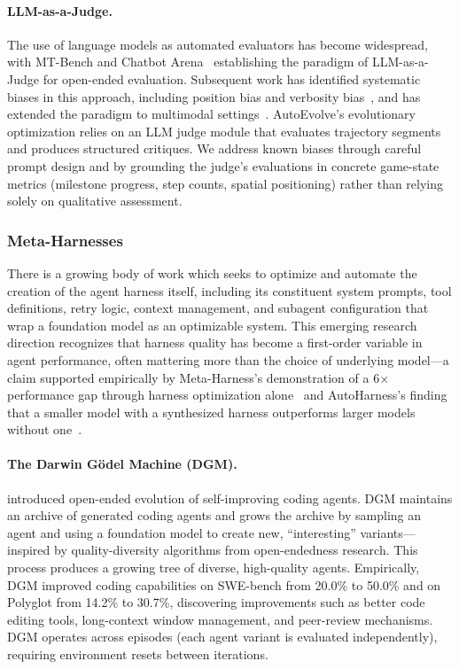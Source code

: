 \paragraph{LLM-as-a-Judge.} The use of language models as automated evaluators has become widespread, with MT-Bench and Chatbot Arena~\citep{zheng2023mtbench} establishing the paradigm of LLM-as-a-Judge for open-ended evaluation. Subsequent work has identified systematic biases in this approach, including position bias and verbosity bias~\citep{zhao2024llmjudgefailures}, and has extended the paradigm to multimodal settings~\citep{chen2024mllmjudge}. AutoEvolve's evolutionary optimization relies on an LLM judge module that evaluates trajectory segments and produces structured critiques. We address known biases through careful prompt design and by grounding the judge's evaluations in concrete game-state metrics (milestone progress, step counts, spatial positioning) rather than relying solely on qualitative assessment.

\subsubsection{Meta-Harnesses}\label{sec:meta_harnesses}

There is a growing body of work which seeks to optimize and automate the creation of the agent harness itself, including its constituent system prompts, tool definitions, retry logic, context management, and subagent configuration that wrap a foundation model as an optimizable system. This emerging research direction recognizes that harness quality has become a first-order variable in agent performance, often mattering more than the choice of underlying model---a claim supported empirically by Meta-Harness's demonstration of a 6$\times$ performance gap through harness optimization alone~\citep{lee2026metaharness} and AutoHarness's finding that a smaller model with a synthesized harness outperforms larger models without one~\citep{lou2026autoharness}.

\paragraph{The Darwin G\"{o}del Machine (DGM).} \citet{zhang2025dgm} introduced open-ended evolution of self-improving coding agents. DGM maintains an archive of generated coding agents and grows the archive by sampling an agent and using a foundation model to create new, ``interesting'' variants---inspired by quality-diversity algorithms from open-endedness research. This process produces a growing tree of diverse, high-quality agents. Empirically, DGM improved coding capabilities on SWE-bench from 20.0\% to 50.0\% and on Polyglot from 14.2\% to 30.7\%, discovering improvements such as better code editing tools, long-context window management, and peer-review mechanisms. DGM operates across episodes (each agent variant is evaluated independently), requiring environment resets between iterations.

